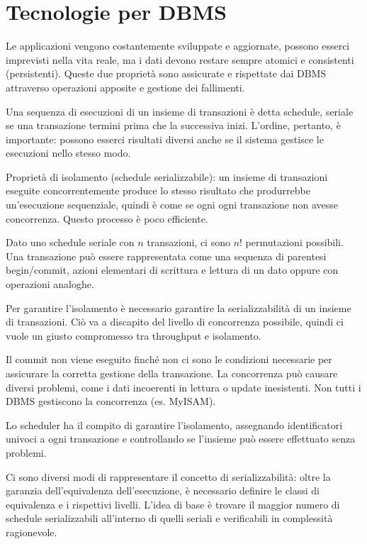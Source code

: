 \section{Tecnologie per DBMS}
Le applicazioni vengono costantemente sviluppate e aggiornate, possono esserci imprevisti nella vita reale, ma i dati devono restare sempre atomici e consistenti (persistenti). Queste due proprietà sono assicurate e rispettate dai DBMS attraverso operazioni apposite e gestione dei fallimenti. 

Una sequenza di esecuzioni di un insieme di transazioni è detta schedule, seriale se una transazione termini prima che la successiva inizi. L'ordine, pertanto, è importante: possono esserci risultati diversi anche se il sistema gestisce le esecuzioni nello stesso modo.

Proprietà di isolamento (schedule serializzabile): un insieme di transazioni eseguite concorrentemente produce lo stesso risultato che produrrebbe un'esecuzione sequenziale, quindi è come se ogni ogni transazione non avesse concorrenza. Questo processo è poco efficiente. 

Dato uno schedule seriale con $n$ transazioni, ci sono $n!$ permutazioni possibili. Una transazione può essere rappresentata come una sequenza di parentesi begin/commit, azioni elementari di scrittura e lettura di un dato oppure con operazioni analoghe. 

Per garantire l'isolamento è necessario garantire la serializzabilità di un insieme di transazioni. Ciò va a discapito del livello di concorrenza possibile, quindi ci vuole un giusto compromesso tra throughput e isolamento. 

Il commit non viene eseguito finché non ci sono le condizioni necessarie per assicurare la corretta gestione della transazione. La concorrenza può causare diversi problemi, come i dati incoerenti in lettura o update inesistenti. Non tutti i DBMS gestiscono la concorrenza (es. MyISAM).

Lo scheduler ha il compito di garantire l'isolamento, assegnando identificatori univoci a ogni transazione e controllando se l'insieme può essere effettuato senza problemi. 

Ci sono diversi modi di rappresentare il concetto di serializzabilità: oltre la garanzia dell'equivalenza dell'esecuzione, è necessario definire le classi di equivalenza e i rispettivi livelli. L'idea di base è trovare il maggior numero di schedule serializzabili all'interno di quelli seriali e verificabili in complessità ragionevole.

